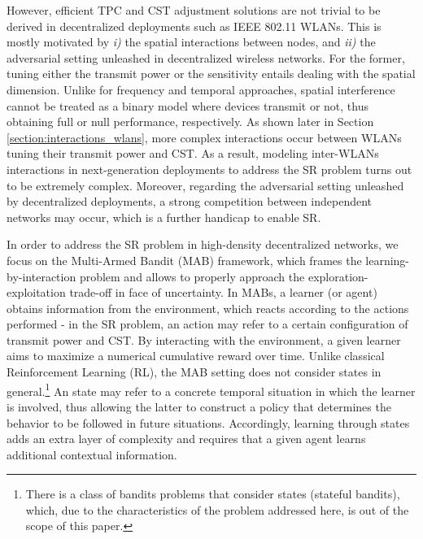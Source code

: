 \documentclass[preprint,12pt]{elsarticle}
\begin{document}
However, efficient TPC and CST adjustment solutions are not trivial to be derived in decentralized deployments such as IEEE 802.11 WLANs. This is mostly motivated by \emph{i)} the spatial interactions between nodes, and \emph{ii)} the adversarial setting unleashed in decentralized wireless networks. For the former, tuning either the transmit power or the sensitivity entails dealing with the spatial dimension. Unlike for frequency and temporal approaches, spatial interference cannot be treated as a binary model where devices transmit or not, thus obtaining full or null performance, respectively. As shown later in Section \ref{section:interactions_wlans}, more complex interactions occur between WLANs tuning their transmit power and CST. As a result, modeling inter-WLANs interactions in next-generation deployments to address the SR problem turns out to be extremely complex. 
Moreover, regarding the adversarial setting unleashed by decentralized deployments, a strong competition between independent networks may occur, which is a further handicap to enable SR. 

In order to address the SR problem in high-density decentralized networks, we focus on the Multi-Armed Bandit (MAB) framework, which frames the learning-by-interaction problem and allows to properly approach the exploration-exploitation trade-off in face of uncertainty. In MABs, a learner (or agent) obtains information from the environment, which reacts according to the actions performed - in the SR problem, an action may refer to a certain configuration of transmit power and CST. By interacting with the environment, a given learner aims to maximize a numerical cumulative reward over time. Unlike classical Reinforcement Learning (RL), the MAB setting does not consider states in general.\footnote{There is a class of bandits problems that consider states (stateful bandits), which, due to the characteristics of the problem addressed here, is out of the scope of this paper.} An state may refer to a concrete temporal situation in which the learner is involved, thus allowing the latter to construct a policy that determines the behavior to be followed in future situations. Accordingly, learning through states adds an extra layer of complexity and requires that a given agent learns additional contextual information.
\end{document}
